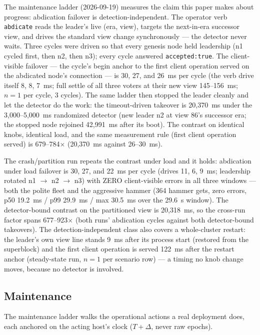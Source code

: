 \documentclass[10pt,journal,letterpaper]{IEEEtran}
\newcommand{\code}[1]{\texttt{\small #1}}
\begin{document}
The maintenance ladder (2026-09-19) measures the claim this paper makes
about progress: abdication failover is detection-independent. The operator
verb \code{abdicate} reads the leader's live (era, view), targets the
next-in-era successor view, and drives the standard view change
synchronously --- the detector never waits. Three cycles were driven so
that every genesis node held leadership (n1 cycled first, then n2, then
n3); every cycle answered \code{accepted:true}. The client-visible failover
--- the cycle's begin anchor to the first client operation served on the
abdicated node's connection --- is 30, 27, and 26~ms per cycle (the verb
drive itself 8, 8, 7~ms; full settle of all three voters at their new view
145--156~ms; $n=1$ per cycle, 3 cycles). The same ladder then stopped the
leader cleanly and let the detector do the work: the timeout-driven
takeover is 20,370~ms under the 3{,}000--5{,}000~ms randomized detector
(new leader n2 at view 86's successor era; the stopped node rejoined
42,991~ms after its boot). The contrast on identical knobs, identical load,
and the same measurement rule (first client operation served) is
679--784$\times$ (20,370~ms against 26--30~ms).

The crash/partition run repeats the contrast under load and it holds:
abdication under load failover is 30, 27, and 22~ms per cycle (drives 11,
6, 9~ms; leadership rotated n1 $\to$ n2 $\to$ n3) with ZERO client-visible
errors in all three windows --- both the polite fleet and the aggressive
hammer (364 hammer gets, zero errors, p50 19.2~ms / p99 29.9~ms / max
30.5~ms over the 29.6~s window). The detector-bound contrast on the
partitioned view is 20,318~ms, so the cross-run factor spans 677--923$\times$
(both runs' abdication cycles against both detector-bound takeovers). The
detection-independent class also covers a whole-cluster restart: the
leader's own view line stands 9~ms after its process start (restored from
the superblock) and the first client operation is served 122~ms after the
restart anchor (steady-state run, $n=1$ per scenario row) --- a timing no
knob change moves, because no detector is involved.

\subsection{Maintenance}\label{sec:exp-maintenance}

The maintenance ladder walks the operational actions a real deployment
does, each anchored on the acting host's clock ($T+\Delta$, never raw
epochs).
\end{document}

